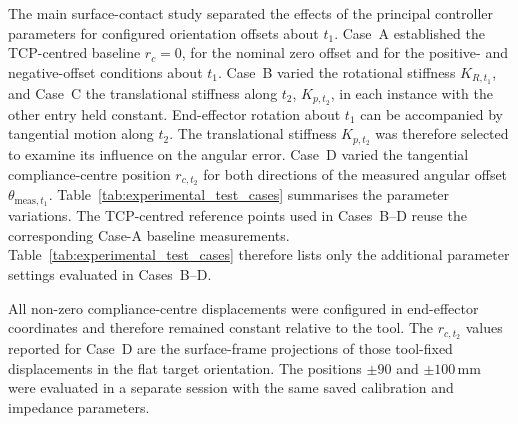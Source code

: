The main surface-contact study separated the effects of the principal
controller parameters for configured orientation offsets about \(t_1\).
Case~A established the TCP-centred baseline \(r_c=0\), for the nominal zero
offset and for the positive- and negative-offset conditions about \(t_1\).
Case~B varied the rotational stiffness \(K_{R,t_1}\), and Case~C the
translational stiffness along \(t_2\), \(K_{p,t_2}\), in each instance with the
other entry held constant. End-effector rotation about \(t_1\) can be
accompanied by tangential motion along \(t_2\). The translational stiffness
\(K_{p,t_2}\) was therefore selected to examine its influence on the angular
error. Case~D varied the tangential compliance-centre position
\(r_{c,t_2}\) for both directions of the measured angular offset
\(\theta_{\mathrm{meas},t_1}\). Table~\ref{tab:experimental_test_cases} summarises the
parameter variations. The TCP-centred reference points used in Cases~B--D
reuse the corresponding Case-A baseline measurements.
Table~\ref{tab:experimental_test_cases} therefore lists only the additional
parameter settings evaluated in Cases~B--D.

All non-zero compliance-centre displacements were configured in end-effector
coordinates and therefore remained constant relative to the tool. The
\(r_{c,t_2}\) values reported for Case~D are the surface-frame projections of
those tool-fixed displacements in the flat target orientation.
The positions \(\pm90\) and \(\pm100\,\mathrm{mm}\) were evaluated
in a separate session with the same saved calibration and impedance parameters.

